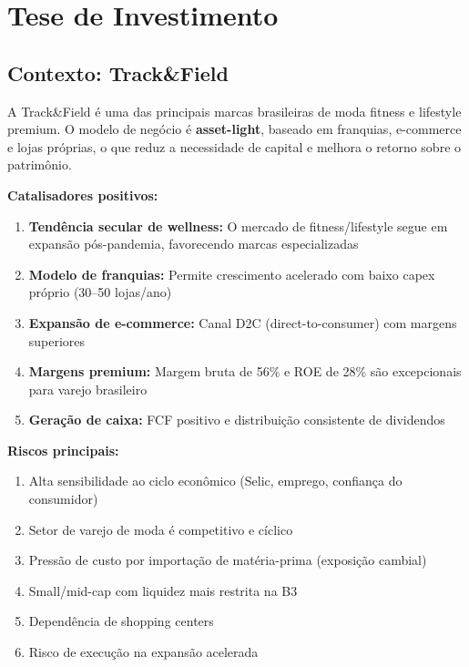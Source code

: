 \documentclass[12pt, a4paper]{article}
\begin{document}
\section{Tese de Investimento}

\subsection{Contexto: Track\&Field}

A Track\&Field é uma das principais marcas brasileiras de moda fitness e lifestyle premium. O modelo de negócio é \textbf{asset-light}, baseado em franquias, e-commerce e lojas próprias, o que reduz a necessidade de capital e melhora o retorno sobre o patrimônio.

\textbf{Catalisadores positivos:}
\begin{enumerate}[leftmargin=*]
    \item \textbf{Tendência secular de wellness:} O mercado de fitness/lifestyle segue em expansão pós-pandemia, favorecendo marcas especializadas
    \item \textbf{Modelo de franquias:} Permite crescimento acelerado com baixo capex próprio (30--50 lojas/ano)
    \item \textbf{Expansão de e-commerce:} Canal D2C (direct-to-consumer) com margens superiores
    \item \textbf{Margens premium:} Margem bruta de 56\% e ROE de 28\% são excepcionais para varejo brasileiro
    \item \textbf{Geração de caixa:} FCF positivo e distribuição consistente de dividendos
\end{enumerate}

\textbf{Riscos principais:}
\begin{enumerate}[leftmargin=*]
    \item Alta sensibilidade ao ciclo econômico (Selic, emprego, confiança do consumidor)
    \item Setor de varejo de moda é competitivo e cíclico
    \item Pressão de custo por importação de matéria-prima (exposição cambial)
    \item Small/mid-cap com liquidez mais restrita na B3
    \item Dependência de shopping centers
    \item Risco de execução na expansão acelerada
\end{enumerate}

\end{document}
